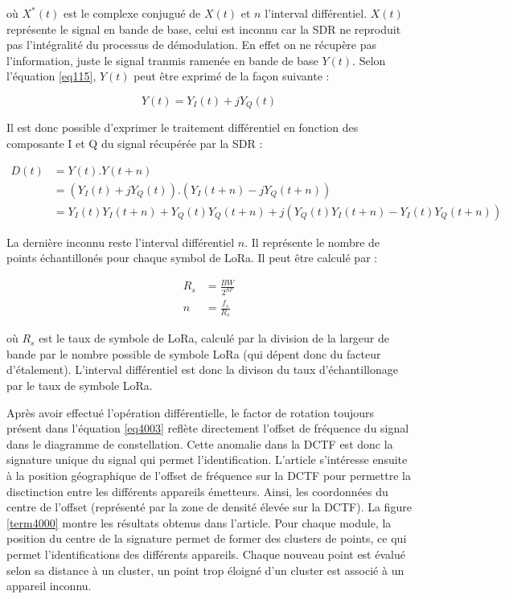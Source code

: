 où $X^{*}(t)$ est le complexe conjugué de $X(t)$ et $n$ l'interval différentiel. $X(t)$ représente le signal en bande de base, celui est inconnu car la SDR ne reproduit pas l'intégralité du processus de démodulation. En effet on ne récupère pas l'information, juste le signal tranmis ramenée en bande de base $Y(t)$. Selon l'équation \ref{eq115}, $Y(t)$ peut être exprimé de la façon suivante : 

\begin{equation}\label{eq4004}
	Y(t) = Y_I(t) + jY_Q(t)
\end{equation} 

Il est donc possible d'exprimer le traitement différentiel en fonction des composante I et Q du signal récupérée par la SDR :

\begin{align}\label{eq4005}
	D(t) &= Y(t) . Y(t+n) \\
		 &= (Y_I(t) + jY_Q(t)) . (Y_I(t+n) - jY_Q(t+n)) \\
 		 &= Y_I(t)Y_I(t+n) + Y_Q(t)Y_Q(t+n) + j(Y_Q(t)Y_I(t+n) - Y_I(t)Y_Q(t+n))
\end{align}

La dernière inconnu reste l'interval différentiel $n$. Il représente le nombre de points échantillonés pour chaque symbol de LoRa. Il peut être calculé par :

\begin{align}\label{eq4006}
	R_s &= \frac{BW}{2^{SF}} \\
	n	&= \frac{f_s}{R_s}
\end{align}

où $R_s$ est le taux de symbole de LoRa, calculé par la division de la largeur de bande par le nombre possible de symbole LoRa (qui dépent donc du facteur d'étalement). L'interval différentiel est donc la divison du taux d'échantillonage par le taux de symbole LoRa.

\vspace{0.1cm}

Après avoir effectué l'opération différentielle, le factor de rotation toujours présent dans l'équation \ref{eq4003} reflète directement l'offset de fréquence du signal dans le diagramme de constellation. Cette anomalie dans la DCTF est donc la signature unique du signal qui permet l'identification. L'article s'intéresse ensuite à la position géographique de l'offset de fréquence sur la DCTF pour permettre la disctinction entre les différents appareils émetteurs. Ainsi, les coordonnées du centre de l'offset (représenté par la zone de densité élevée sur la DCTF). La figure \ref{term4000} montre les résultats obtenus dans l'article. Pour chaque module, la position du centre de la signature permet de former des clusters de points, ce qui permet l'identifications des différents appareils. Chaque nouveau point est évalué selon sa distance à un cluster, un point trop éloigné d'un cluster est associé à un appareil inconnu.


